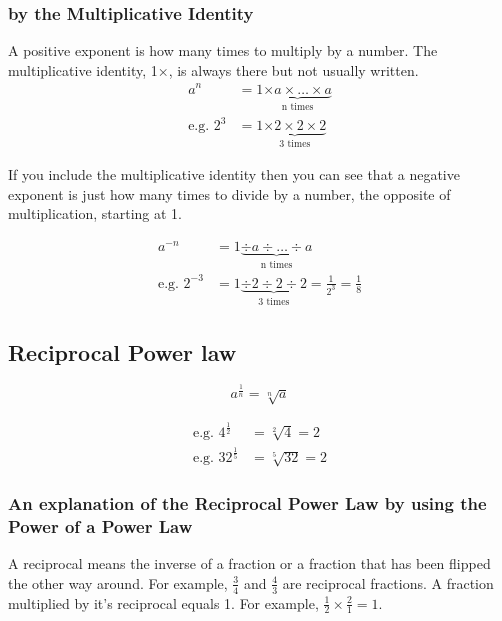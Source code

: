 \documentclass{article}
\begin{document}
\vspace{16pt}

\subsubsection*{by the Multiplicative Identity}
A positive exponent is how many times to multiply by a number. The multiplicative identity, 1×, is always there but not usually written.
\begin{align*}
a^n&=1 \underbrace{\times a \times \ldots \times a}_{\text{n times}}\\

\text{e.g. }2^3&=1 \underbrace{\times 2 \times 2 \times 2}_{\text{3 times}}
\end{align*}

If you include the multiplicative identity then you can see that a negative exponent is just how many times to divide by a number, the opposite of multiplication, starting at 1.

\begin{align*}
a^{-n}&=1 \underbrace{\div a \div \ldots \div a}_{\text{n times}}\\
\text{e.g. }2^{-3}&=1 \underbrace{\div 2 \div 2 \div 2}_{\text{3 times}}=\frac{1}{2^3}=\frac{1}{8}
\end{align*}

\newpage

\subsection{Reciprocal Power law}
\begin{Large}
$$a^{\frac{1}{n}}=\sqrt[n]{a}$$
\end{Large}
\begin{center}
\begin{align*}
\text{e.g. }4^{\frac{1}{2}}&=\sqrt[2]{4}=2\\
\text{e.g. }32^{\frac{1}{5}}&=\sqrt[5]{32}=2
\end{align*}
\end{center}

\vspace{16pt}
\subsubsection*{An explanation of the Reciprocal Power Law by using the Power of a Power Law}

A reciprocal means the inverse of a fraction or a fraction that has been flipped the other way around. For example, $\frac{3}{4}$ and $\frac{4}{3}$ are reciprocal fractions. A fraction multiplied by it’s reciprocal equals 1. For example, $\frac{1}{2} \times \frac{2}{1}=1$.
\end{document}
